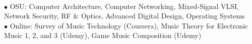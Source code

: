 \documentclass[10pt]{article}
\begin{document}
\\
$\bullet$ OSU: Computer Architecture, Computer Networking, Mixed-Signal VLSI, Network Security, RF \& Optics, Advanced Digital Design, Operating Systems\\
$\bullet$ Online: Survey of Music Technology (Coursera), Music Theory for Electronic Music 1, 2, and 3 (Udemy), Game Music Composition (Udemy)
\end{document}
